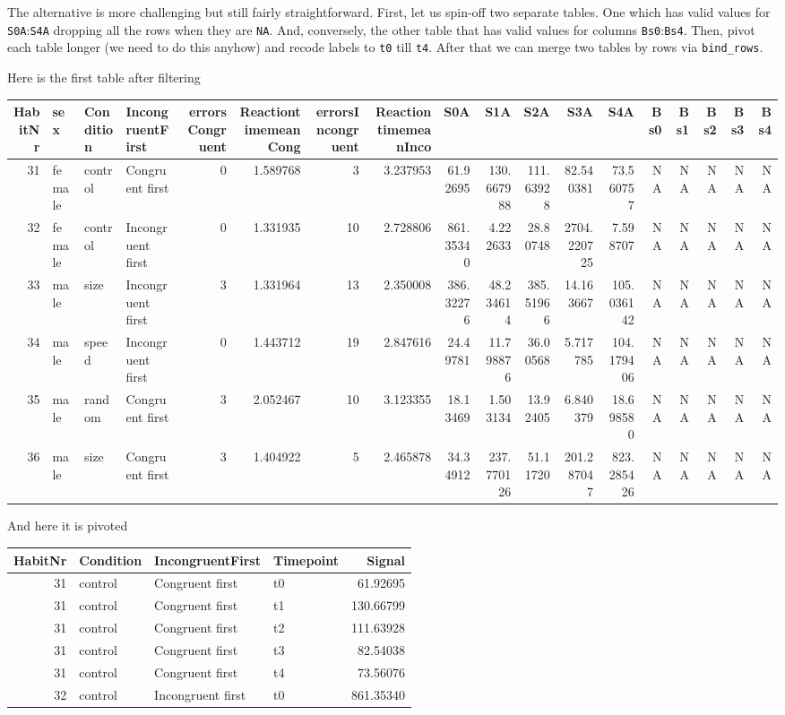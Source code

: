 \documentclass[
]{book}
\begin{document}
The alternative is more challenging but still fairly straightforward. First, let us spin-off two separate tables. One which has valid values for \texttt{S0A}:\texttt{S4A} dropping all the rows when they are \texttt{NA}. And, conversely, the other table that has valid values for columns \texttt{Bs0}:\texttt{Bs4}. Then, pivot each table longer (we need to do this anyhow) and recode labels to \texttt{t0} till \texttt{t4}. After that we can merge two tables by rows via \texttt{bind\_rows}.

Here is the first table after filtering

\begin{tabular}{r|l|l|l|r|r|r|r|r|r|r|r|r|r|r|r|r|r}
\hline
HabitNr & sex & Condition & IncongruentFirst & errorsCongruent & ReactiontimemeanCong & errorsIncongruent & ReactiontimemeanInco & S0A & S1A & S2A & S3A & S4A & Bs0 & Bs1 & Bs2 & Bs3 & Bs4\\
\hline
31 & female & control & Congruent first & 0 & 1.589768 & 3 & 3.237953 & 61.92695 & 130.667988 & 111.63928 & 82.540381 & 73.560757 & NA & NA & NA & NA & NA\\
\hline
32 & female & control & Incongruent first & 0 & 1.331935 & 10 & 2.728806 & 861.35340 & 4.222633 & 28.80748 & 2704.220725 & 7.598707 & NA & NA & NA & NA & NA\\
\hline
33 & male & size & Incongruent first & 3 & 1.331964 & 13 & 2.350008 & 386.32276 & 48.234614 & 385.51966 & 14.163667 & 105.036142 & NA & NA & NA & NA & NA\\
\hline
34 & male & speed & Incongruent first & 0 & 1.443712 & 19 & 2.847616 & 24.49781 & 11.798876 & 36.00568 & 5.717785 & 104.179406 & NA & NA & NA & NA & NA\\
\hline
35 & male & random & Congruent first & 3 & 2.052467 & 10 & 3.123355 & 18.13469 & 1.503134 & 13.92405 & 6.840379 & 18.698580 & NA & NA & NA & NA & NA\\
\hline
36 & male & size & Congruent first & 3 & 1.404922 & 5 & 2.465878 & 34.34912 & 237.770126 & 51.11720 & 201.287047 & 823.285426 & NA & NA & NA & NA & NA\\
\hline
\end{tabular}

And here it is pivoted

\begin{tabular}{r|l|l|l|r}
\hline
HabitNr & Condition & IncongruentFirst & Timepoint & Signal\\
\hline
31 & control & Congruent first & t0 & 61.92695\\
\hline
31 & control & Congruent first & t1 & 130.66799\\
\hline
31 & control & Congruent first & t2 & 111.63928\\
\hline
31 & control & Congruent first & t3 & 82.54038\\
\hline
31 & control & Congruent first & t4 & 73.56076\\
\hline
32 & control & Incongruent first & t0 & 861.35340\\
\hline
\end{tabular}
\end{document}
